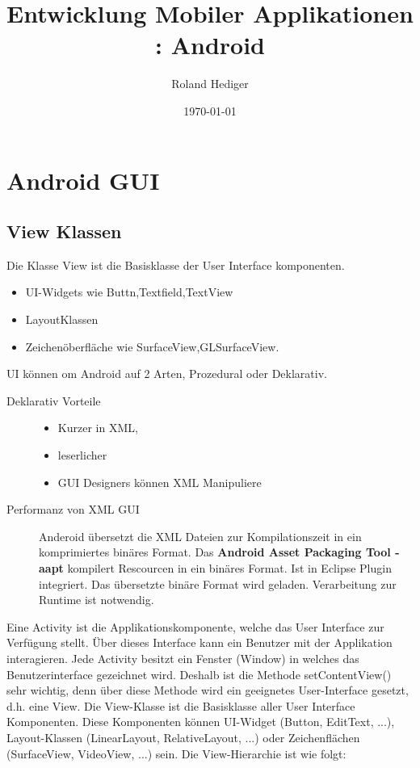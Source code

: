 \documentclass[a4paper,10pt,titlepage=false]{scrreprt}
\title{Entwicklung Mobiler Applikationen : Android}
\author{Roland Hediger}
\date{\today}
\begin{document}
\maketitle
\tableofcontents
\pagestyle{fancy}
\chapter{Android GUI}
\section{View Klassen}
Die Klasse View ist die Basisklasse der User Interface komponenten.
\begin{itemize}
 \item UI-Widgets wie Buttn,Textfield,TextView
 \item LayoutKlassen
 \item Zeichenöberfläche wie SurfaceView,GLSurfaceView.

\end{itemize}
UI können om Android auf 2 Arten, Prozedural oder Deklarativ.
\begin{description}
	\item[Deklarativ Vorteile]
	\begin{itemize}
	 \item Kurzer in XML,
	 \item leserlicher
	 \item GUI Designers können XML Manipuliere
	\end{itemize}
	\item[Performanz von XML GUI] Anderoid übersetzt die XML Dateien zur Kompilationszeit in ein komprimiertes binäres Format. Das \textbf{Android Asset Packaging Tool - aapt} kompilert Rescourcen in ein binäres Format. Ist in Eclipse Plugin integriert. Das übersetzte binäre Format wird geladen. Verarbeitung zur Runtime ist notwendig.
\end{description}
Eine Activity ist die Applikationskomponente, welche das User Interface zur Verfügung stellt. Über
dieses Interface kann ein Benutzer mit der Applikation interagieren. Jede Activity besitzt ein Fenster
(Window) in welches das Benutzerinterface gezeichnet wird. Deshalb ist die Methode
setContentView() sehr wichtig, denn über diese Methode wird ein geeignetes User-Interface
gesetzt, d.h. eine View.
Die View-Klasse ist die Basisklasse aller User Interface Komponenten. Diese Komponenten können
UI-Widget (Button, EditText, ...), Layout-Klassen (LinearLayout, RelativeLayout, ...) oder
Zeichenflächen (SurfaceView, VideoView, ...) sein. Die View-Hierarchie ist wie folgt:
\end{document}
